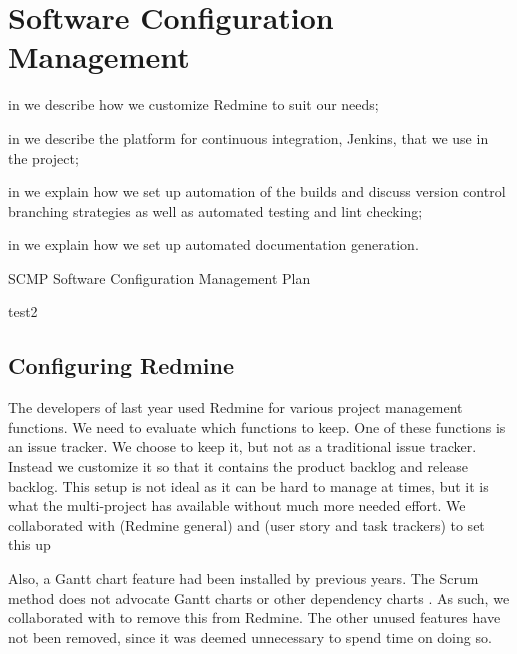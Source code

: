 \chapter{Software Configuration Management}\label{chap:config_management}

\begin{chapterorganization}
  \item in  we describe how we customize Redmine to suit our needs;
  \item in  we describe the platform for continuous integration, Jenkins, that we use in the project;
  \item in  we explain how we set up automation of the builds and discuss version control branching strategies as well as automated testing and lint checking;
  \item in  we explain how we set up automated documentation generation.
\end{chapterorganization}

\begin{abbreviations}
  \item[SCMP] Software Configuration Management Plan
  \item[test2] \dummy
\end{abbreviations}

\section{Configuring Redmine}\label{sec:redmine-conf}
The developers of last year used Redmine for various project management functions. We need to evaluate which functions to keep.
One of these functions is an issue tracker. We choose to keep it, but not as a traditional issue tracker.  Instead we customize it so that it contains the product backlog and release backlog.  This setup is not ideal as it can be hard to manage at times, but it is what the multi-project has available without much more needed effort. We collaborated with  (Redmine general) and  (user story and task trackers) to set this up

Also, a Gantt chart feature had been installed by previous years. The Scrum method does not advocate Gantt charts or other dependency charts \parencite{larman2003}. As such, we collaborated with  to remove this from Redmine. The other unused features have not been removed, since it was deemed unnecessary to spend time on doing so.

